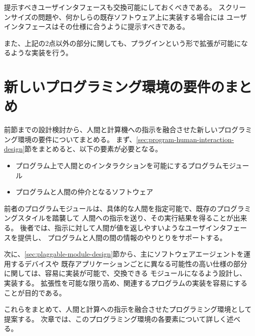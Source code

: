 提示すべきユーザインタフェースも交換可能にしておくべきである。
スクリーンサイズの問題や、何かしらの既存ソフトウェア上に実装する場合には
ユーザインタフェースはその仕様に合うように提示すべきである。

また、上記の2点以外の部分に関しても、プラグインという形で拡張が可能になるような実装を行う。

\section{新しいプログラミング環境の要件のまとめ}\label{ux65b0ux3057ux3044ux30d7ux30edux30b0ux30e9ux30dfux30f3ux30b0ux74b0ux5883ux306eux8981ux4ef6ux306eux307eux3068ux3081}

前節までの設計検討から、人間と計算機への指示を融合させた新しいプログラミング環境の要件についてまとめる。
まず、\ref{sec:program-human-interaction-design}節をまとめると、以下の要素が必要となる。

\begin{itemize}
\itemsep1pt\parskip0pt
\item
  プログラム上で人間とのインタラクションを可能にするプログラムモジュール
\item
  プログラムと人間の仲介となるソフトウェア
\end{itemize}

前者のプログラムモジュールは、具体的な人間を指定可能で、既存のプログラミングスタイルを踏襲して
人間への指示を送り、その実行結果を得ることが出来る。
後者では、指示に対して人間が値を返しやすいようなユーザインタフェースを提供し、
プログラムと人間の間の情報のやりとりをサポートする。

次に、\ref{sec:plaggable-module-design}節から、主にソフトウェアエージェントを運用するデバイスや
既存アプリケーションごとに異なる可能性の高い仕様の部分に関しては、容易に実装が可能で、交換できる
モジュールになるよう設計し、実装する。
拡張性を可能な限り高め、関連するプログラムの実装を容易にすることが目的である。

これらをまとめて、人間と計算への指示を融合させたプログラミング環境として提案する。
次章では、このプログラミング環境の各要素について詳しく述べる。

